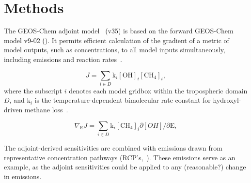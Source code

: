\section{Methods}

The GEOS-Chem adjoint model~\cite{ref:henze2007} (v35) is based on the forward GEOS-Chem model v9-02 (\href{http://www.geos-chem.org}{}). It permits efficient calculation of the gradient of a metric of model outputs, such as concentrations, to all model inputs simultaneously, including emissions and reaction rates~\cite{ref:walker2015}.

\begin{equation}
J=\sum_{i \in D} \mathrm{k}_i \mathrm{[OH]}_i \mathrm{[CH_4]}_i,
\end{equation}
where the subscript $i$ denotes each model gridbox within the tropospheric domain $D$, and $\mathrm{k}_i$ is the temperature-dependent bimolecular rate constant for hydroxyl-driven methane loss~\citep{ref:sander2011}.

\begin{equation}
\nabla_\mathrm{E} J = \sum_{i \in D} \mathrm{k}_i \mathrm{[CH_4]}_i \partial{[OH]}/\partial \mathrm{E},
\end{equation}

The adjoint-derived sensitivities are combined with emissions drawn from representative concentration pathways (RCP's,~\citet{ref:vanvuuren2011}). These emissions serve as an example, as the adjoint sensitivities could be applied to any (reasonable?) change in emissions.